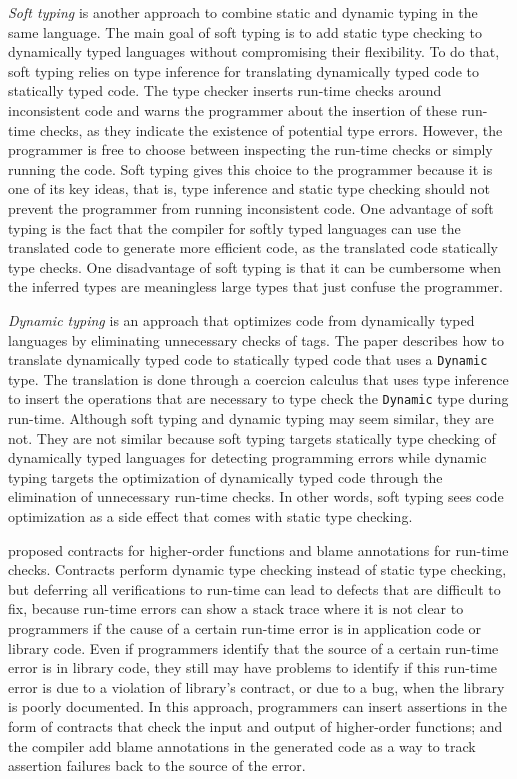 \emph{Soft typing} \citep{cartwright1991soft} is another approach
to combine static and dynamic typing in the same language.
The main goal of soft typing is to add static type checking to
dynamically typed languages without compromising their flexibility.
To do that, soft typing relies on type inference for
translating dynamically typed code to statically typed code.
The type checker inserts run-time checks around inconsistent code and
warns the programmer about the insertion of these run-time checks,
as they indicate the existence of potential type errors.
However, the programmer is free to choose between inspecting the
run-time checks or simply running the code.
Soft typing gives this choice to the programmer because it is one of
its key ideas, that is, type inference and static type checking should
not prevent the programmer from running inconsistent code.
One advantage of soft typing is the fact that the compiler for
softly typed languages can use the translated code to generate
more efficient code, as the translated code statically type checks.
One disadvantage of soft typing is that it can be cumbersome when
the inferred types are meaningless large types that just confuse the
programmer.

\emph{Dynamic typing} \citep{henglein1994dts} is an approach
that optimizes code from dynamically typed languages by eliminating
unnecessary checks of tags.
The paper describes how to translate dynamically typed code to
statically typed code that uses a \texttt{Dynamic} type.
The translation is done through a coercion calculus that uses type
inference to insert the operations that are necessary to type check
the \texttt{Dynamic} type during run-time.
Although soft typing and dynamic typing may seem similar, they are not.
They are not similar because soft typing targets statically type
checking of dynamically typed languages for detecting programming
errors while dynamic typing targets the optimization of dynamically
typed code through the elimination of unnecessary run-time checks.
In other words, soft typing sees code optimization as a side effect
that comes with static type checking.

\citet{findler2002chf} proposed contracts for higher-order functions
and blame annotations for run-time checks.
Contracts perform dynamic type checking instead of static type checking,
but deferring all verifications to run-time can lead to defects
that are difficult to fix, because run-time errors can show a
stack trace where it is not clear to programmers if the cause of a
certain run-time error is in application code or library code.
Even if programmers identify that the source of a certain run-time
error is in library code, they still may have problems to identify
if this run-time error is due to a violation of library's contract,
or due to a bug, when the library is poorly documented.
In this approach, programmers can insert assertions in the form of
contracts that check the input and output of higher-order functions;
and the compiler add blame annotations in the generated code as a way
to track assertion failures back to the source of the error.


